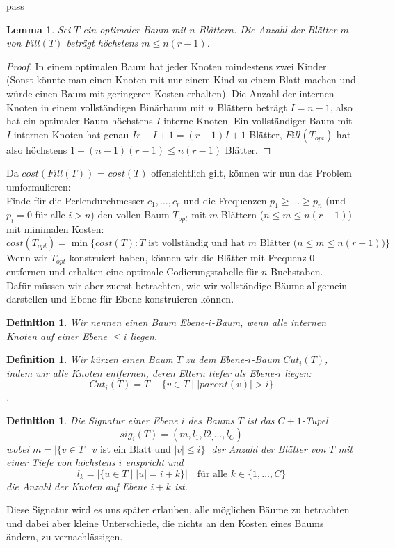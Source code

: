 pass\documentclass[a4paper,10pt,ngerman]{scrartcl}
\newtheorem{definition}[satz]{Definition}
\newtheorem{lemma}[satz]{Lemma}
\begin{document}
    \begin{lemma}
        Sei $T$ ein optimaler Baum mit $n$ Blättern. Die Anzahl der Blätter $m$ von $Fill(T)$ beträgt höchstens $m \le n(r-1)$.
    \end{lemma}
    \begin{proof}
        In einem optimalen Baum hat jeder Knoten mindestens zwei Kinder (Sonst könnte man einen Knoten mit nur einem Kind zu einem Blatt machen und würde einen Baum mit geringeren Kosten erhalten). Die Anzahl der internen Knoten in einem vollständigen Binärbaum mit $n$ Blättern beträgt $I = n - 1$, also hat ein optimaler Baum höchstens $I$ interne Knoten.
        Ein vollständiger Baum mit $I$ internen Knoten hat genau $Ir - I + 1 = (r-1)I + 1$ Blätter, $Fill(T_{opt})$ hat also höchstens $1 + (n -1)(r-1) \le n(r-1)$ Blätter.
    \end{proof}
    Da $cost(Fill(T))$ = $cost(T)$ offensichtlich gilt, können wir nun das Problem umformulieren:\\
    Finde für die Perlendurchmesser $c_1, \dots, c_r$ und die Frequenzen $p_1 \ge \dots \ge p_n$ (und $p_i = 0$ für alle $i > n$) den vollen Baum $T_{opt}$ mit $m$ Blättern ($n \le m \le n(r - 1)$) mit minimalen Kosten:
    \[cost(T_{opt}) = \min \{cost(T) : T \text{ ist vollständig und hat $m$ Blätter ($n \le m \le n(r - 1)$)}\}\]
    Wenn wir $T_{opt}$ konstruiert haben, können wir die Blätter mit Frequenz 0 entfernen und erhalten eine optimale Codierungstabelle für $n$ Buchstaben. \\
    Dafür müssen wir aber zuerst betrachten, wie wir vollständige Bäume allgemein darstellen und Ebene für Ebene konstruieren können.

    \begin{definition}
        Wir nennen einen Baum Ebene-$i$-Baum, wenn alle internen Knoten auf einer Ebene $\le i$ liegen. \\
    \end{definition}
    \begin{definition}
        Wir kürzen einen Baum $T$ zu dem Ebene-$i$-Baum $Cut_i(T)$, indem wir alle Knoten entfernen, deren Eltern tiefer als Ebene-$i$ liegen: \[Cut_i(T) = T - \{v \in T \mid |parent(v)| > i\}\].
    \end{definition}
    \begin{definition}
        Die Signatur einer Ebene $i$ des Baums $T$ ist das $C + 1$-Tupel \[sig_i(T) = (m, l_1,l2_, \dots, l_C)\]
        wobei $m = |\{v \in T \mid v \text{ ist ein Blatt und } |v| \le i\}|$ der Anzahl der Blätter von $T$ mit einer Tiefe von höchstens $i$ enspricht und
        \[l_k = |\{u \in T \mid |u| = i + k\}| \text{~~~für alle } k \in \{1,\dots,C\}\]
        die Anzahl der Knoten auf Ebene $i + k$ ist.
    \end{definition}
    Diese Signatur wird es uns später erlauben, alle möglichen Bäume zu betrachten und dabei aber kleine Unterschiede, die nichts an den Kosten eines Baums ändern, zu vernachlässigen.
\end{document}
